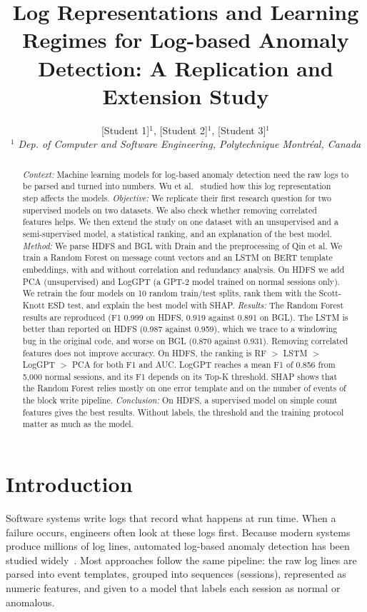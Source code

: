 \documentclass[10pt, conference]{IEEEtran}
\title{Log Representations and Learning Regimes for Log-based Anomaly Detection: A Replication and Extension Study}
\author{[Student 1]$^{1}$, [Student 2]$^{1}$, [Student 3]$^{1}$
    \\
    \emph{$^{1}$ Dep. of Computer and Software Engineering, Polytechnique Montréal, Canada}}
\begin{document}
\maketitle

\begin{abstract}
\textit{Context:} Machine learning models for log-based anomaly detection need the raw logs to be parsed and turned into numbers. Wu et al.~\cite{wu2023effectiveness} studied how this log representation step affects the models.
\textit{Objective:} We replicate their first research question for two supervised models on two datasets. We also check whether removing correlated features helps. We then extend the study on one dataset with an unsupervised and a semi-supervised model, a statistical ranking, and an explanation of the best model.
\textit{Method:} We parse HDFS and BGL with Drain and the preprocessing of Qin et al. We train a Random Forest on message count vectors and an LSTM on BERT template embeddings, with and without correlation and redundancy analysis. On HDFS we add PCA (unsupervised) and LogGPT (a GPT-2 model trained on normal sessions only). We retrain the four models on 10 random train/test splits, rank them with the Scott-Knott ESD test, and explain the best model with SHAP.
\textit{Results:} The Random Forest results are reproduced (F1 0.999 on HDFS, 0.919 against 0.891 on BGL). The LSTM is better than reported on HDFS (0.987 against 0.959), which we trace to a windowing bug in the original code, and worse on BGL (0.870 against 0.931). Removing correlated features does not improve accuracy. On HDFS, the ranking is RF $>$ LSTM $>$ LogGPT $>$ PCA for both F1 and AUC. LogGPT reaches a mean F1 of 0.856 from 5,000 normal sessions, and its F1 depends on its Top-K threshold. SHAP shows that the Random Forest relies mostly on one error template and on the number of events of the block write pipeline.
\textit{Conclusion:} On HDFS, a supervised model on simple count features gives the best results. Without labels, the threshold and the training protocol matter as much as the model.
\end{abstract}

\section{Introduction}
\label{sec:introduction}

Software systems write logs that record what happens at run time. When a failure occurs, engineers often look at these logs first. Because modern systems produce millions of log lines, automated log-based anomaly detection has been studied widely~\cite{he2016experience,du2017deeplog}. Most approaches follow the same pipeline: the raw log lines are parsed into event templates, grouped into sequences (sessions), represented as numeric features, and given to a model that labels each session as normal or anomalous.
\end{document}
